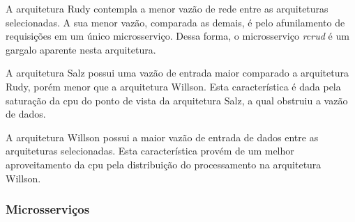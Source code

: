 A arquitetura Rudy contempla a menor vazão de rede entre as arquiteturas selecionadas.
%
A sua menor vazão, comparada as demais, é pelo afunilamento de requisições em um único microsserviço.
%
Dessa forma, o microsserviço \textit{rcrud} é um gargalo aparente nesta arquitetura.

A arquitetura Salz possui uma vazão de entrada maior comparado a arquitetura Rudy, porém menor que a arquitetura Willson.
%
Esta característica é dada pela saturação da \ac{cpu} do ponto de vista da arquitetura Salz, a qual obstruiu a vazão de dados.

A arquitetura Willson possui a maior vazão de entrada de dados entre as arquiteturas selecionadas.
%
Esta característica provém de um melhor aproveitamento da \ac{cpu} pela distribuição do processamento na arquitetura Willson.


\subsubsection{Microsserviços}

